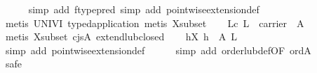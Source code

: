 \begin{isabellebody}
\ \ \ \ \isamarkupfalse%
\ {}simp\ add{}\ ftype{}pred{}\ simp\ add{}\ pointwise{}extension{}def{}\isanewline
\ \ \ \ \isamarkupfalse%
\ {}metis\ UNIV{}I\ typed{}application{}\ metis\ X{}subset{}\isanewline
\isanewline
\ \ \isamarkupfalse%
\ Lc{}\ {}{}L\ {}\ carrier\ {}{}\ A{}{}\isanewline
\ \ \ \ \isamarkupfalse%
\ {}metis\ X{}subset\ cjs{}A\ extend{}lub{}closed{}\isanewline
\isanewline
\ \ \isamarkupfalse%
\ {}{}h{}X{}\ h\ {}\ A\isactrlesub \ {}L{}\isanewline
\ \ \ \ \isamarkupfalse%
\ {}simp\ add{}\ pointwise{}extension{}def{}\isanewline
\ \ \ \ \isamarkupfalse%
\ {}simp\ add{}\ order{}lub{}def{}OF\ ord{}A{}{}\isanewline
\ \ \ \ \isamarkupfalse%
\ safe\isanewline
\ \ \ \ \isamarkupfalse%

\end{isabellebody}
